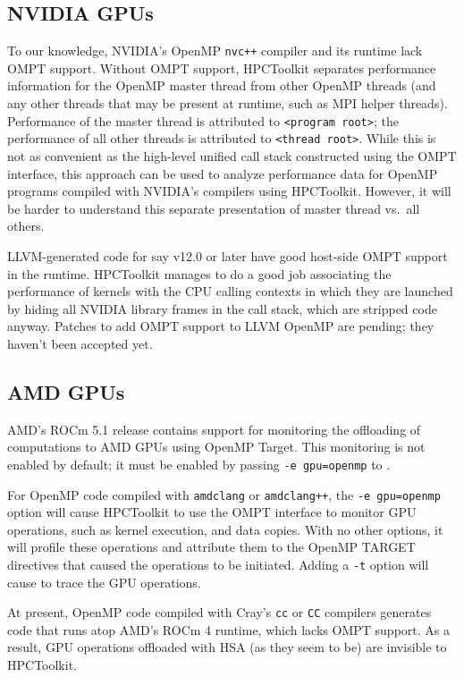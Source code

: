 \documentclass[11pt,twoside,letterpaper]{report}
\begin{document}
\subsection{NVIDIA GPUs}
To our knowledge, NVIDIA's OpenMP {\tt nvc++} compiler and its
runtime lack OMPT support. Without OMPT support, HPCToolkit
separates performance information for the OpenMP master thread from
other OpenMP threads (and any other threads that may be present at
runtime, such as MPI helper threads). Performance of the master thread is
attributed to \verb|<program root>|; the performance of all other threads
is attributed to \verb|<thread root>|. While this is not as convenient
as the high-level unified call stack constructed using the OMPT interface,
this approach can be used to analyze performance data for OpenMP programs
compiled with NVIDIA's compilers using HPCToolkit. However, it will be
harder to understand this separate presentation of master thread vs.\ all others.

LLVM-generated code for say v12.0 or later have good host-side OMPT
support in the runtime. HPCToolkit manages to do a good job associating
the performance of kernels with the CPU calling contexts in which
they are launched by hiding all NVIDIA library frames in the call
stack, which are stripped code anyway. Patches to add OMPT support
to LLVM OpenMP are pending; they haven't been accepted yet.

\subsection{AMD GPUs}
AMD's ROCm 5.1 release contains support for monitoring
the offloading of computations to AMD GPUs using OpenMP Target.
This monitoring is not enabled by default;
it must be enabled by passing {\tt -e gpu=openmp} to \hpcrun{}.

For OpenMP code compiled with {\tt amdclang} or {\tt amdclang++},
the {\tt -e gpu=openmp} option will cause HPCToolkit to use the
OMPT interface to monitor GPU operations, such as kernel execution,
and data copies.  With no other options, it will profile these
operations and attribute them to the OpenMP TARGET directives that
caused the operations to be initiated. Adding a {\tt -t} option
will cause \hpcrun{} to trace the GPU operations.

At present, OpenMP code compiled with Cray's {\tt cc} or {\tt CC}
compilers generates code that runs atop AMD's ROCm 4 runtime, which
lacks OMPT support. As a result, GPU operations offloaded with HSA
(as they seem to be) are invisible to HPCToolkit.
\end{document}

